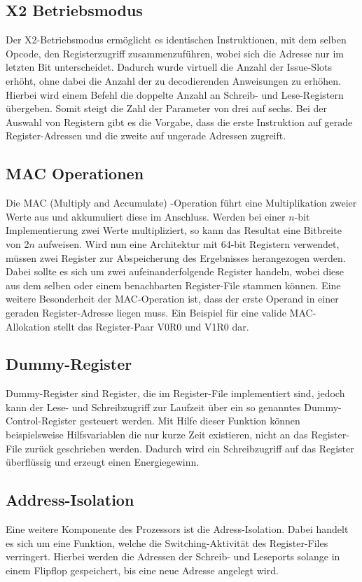 \subsection{X2 Betriebsmodus}\label{subsec:x2Mode}
Der X2-Betriebsmodus ermöglicht es identischen Instruktionen, mit dem selben Opcode, den Registerzugriff zusammenzuführen, wobei sich die Adresse nur im letzten Bit unterscheidet. Dadurch wurde virtuell die Anzahl der Issue-Slots erhöht, ohne dabei die Anzahl der zu decodierenden Anweisungen zu erhöhen. Hierbei wird einem Befehl die doppelte Anzahl an Schreib- und Lese-Registern übergeben. Somit steigt die Zahl der Parameter von drei auf sechs. Bei der Auswahl von Registern gibt es die Vorgabe, dass die erste Instruktion auf gerade Register-Adressen und die zweite auf ungerade Adressen zugreift. \cite{paya2009instruction}
\subsection{MAC Operationen}\label{subsec:macMode}
Die MAC (Multiply and Accumulate) -Operation führt eine Multiplikation zweier Werte aus und akkumuliert diese im Anschluss. Werden bei einer $n$-bit Implementierung zwei Werte multipliziert, so kann das Resultat eine Bitbreite von 2$n$ aufweisen. Wird nun eine Architektur mit 64-bit Registern verwendet, müssen zwei Register zur Abspeicherung des Ergebnisses herangezogen werden. Dabei sollte es sich um zwei aufeinanderfolgende Register handeln, wobei diese aus dem selben oder einem benachbarten Register-File stammen können. Eine weitere Besonderheit der MAC-Operation ist, dass der erste Operand in einer geraden Register-Adresse liegen muss. Ein Beispiel für eine valide MAC-Allokation stellt das  Register-Paar V0R0 und V1R0 dar. \cite{meyer2007digital}
  

\subsection{Dummy-Register}\label{subsec:dummy}
Dummy-Register sind Register, die im Register-File implementiert sind, jedoch kann der Lese- und Schreibzugriff zur Laufzeit über ein so genanntes Dummy-Control-Register gesteuert werden. Mit Hilfe dieser Funktion können beispielsweise Hilfsvariablen die nur kurze Zeit existieren, nicht an das Register-File zurück geschrieben werden. Dadurch wird ein Schreibzugriff auf das Register überflüssig und erzeugt einen Energiegewinn. \cite{lukasglitches2017}

\subsection{Address-Isolation}\label{subsec:add_iso}
Eine weitere Komponente des Prozessors ist die Adress-Isolation. Dabei handelt es sich um eine Funktion, welche die Switching-Aktivität des Register-Files verringert. Hierbei werden die Adressen der Schreib- und Leseports solange in einem Flipflop gespeichert, bis eine neue Adresse angelegt wird.\cite{lukasglitches2017}

